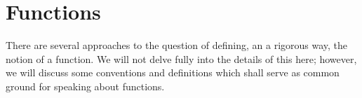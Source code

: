\section{Functions}



There are several approaches to the question of defining, an a rigorous way, the notion of a function. We will not delve fully into the details of this here; however, we will discuss some conventions and definitions which shall serve as common ground for speaking about functions. 


\clearpage
